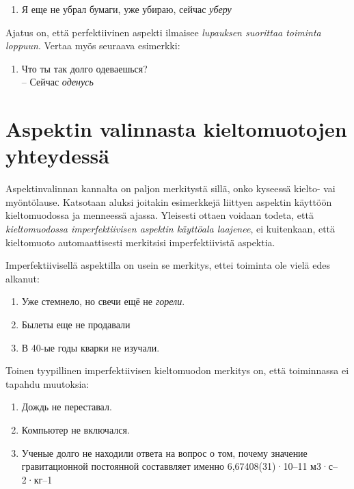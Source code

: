 \documentclass[]{scrreprt}
\providecommand{\tightlist}{%
  \setlength{\itemsep}{0pt}\setlength{\parskip}{0pt}}
\begin{document}
\begin{enumerate}
\def\labelenumi{(\arabic{enumi})}
\setcounter{enumi}{306}
\tightlist
\item
  Я еще не убрал бумаги, уже убираю, сейчас \emph{уберу}
\end{enumerate}

Ajatus on, että perfektiivinen aspekti ilmaisee \emph{lupauksen
suorittaa toiminta loppuun}. Vertaa myös seuraava esimerkki:

\begin{enumerate}
\def\labelenumi{(\arabic{enumi})}
\setcounter{enumi}{307}
\tightlist
\item
  Что ты так долго одеваешься?\\
   -- Сейчас \emph{оденусь}
\end{enumerate}

\section{Aspektin valinnasta kieltomuotojen
yhteydessä}\label{aspektin-valinnasta-kieltomuotojen-yhteydessuxe4}

Aspektinvalinnan kannalta on paljon merkitystä sillä, onko kyseessä
kielto- vai myöntölause. Katsotaan aluksi joitakin esimerkkejä liittyen
aspektin käyttöön kieltomuodossa ja menneessä ajassa. Yleisesti ottaen
voidaan todeta, että \emph{kieltomuodossa imperfektiivisen aspektin
käyttöala laajenee}, ei kuitenkaan, että kieltomuoto automaattisesti
merkitsisi imperfektiivistä aspektia.

Imperfektiivisellä aspektilla on usein se merkitys, ettei toiminta ole
vielä edes alkanut:

\begin{enumerate}
\def\labelenumi{(\arabic{enumi})}
\setcounter{enumi}{308}
\tightlist
\item
  Уже стемнело, но свечи ещё не \emph{горели}.
\item
  Былеты еще не продавали
\item
  В 40-ые годы кварки не изучали.
\end{enumerate}

Toinen tyypillinen imperfektiivisen kieltomuodon merkitys on, että
toiminnassa ei tapahdu muutoksia:

\begin{enumerate}
\def\labelenumi{(\arabic{enumi})}
\setcounter{enumi}{311}
\tightlist
\item
  Дождь не переставал.
\item
  Компьютер не включался.
\item
  Ученые долго не находили ответа на вопрос о том, почему значение
  гравитационной постоянной составвляет именно 6,67408(31)·10--11 м3·с--2·кг--1
\end{enumerate}
\end{document}
